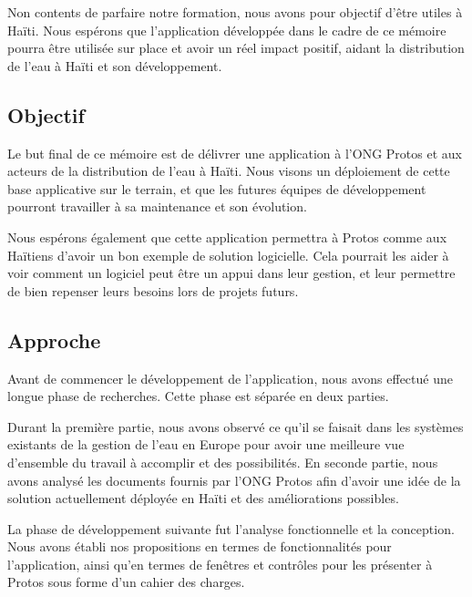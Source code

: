 \documentclass{EPL-master-thesis-covers-FR}
\begin{document}
			Non contents de parfaire notre formation, nous avons pour objectif d'être utiles à Haïti. Nous espérons que l'application développée dans le cadre de ce mémoire pourra être utilisée sur place et avoir un réel impact positif, aidant la distribution de l'eau à Haïti et son développement.

		\subsection*{Objectif}

			Le but final de ce mémoire est de délivrer une application à l'ONG Protos et aux acteurs de la distribution de l'eau à Haïti. Nous visons un déploiement de cette base applicative sur le terrain, et que les futures équipes de développement pourront travailler à sa maintenance et son évolution.

			Nous espérons également que cette application permettra à Protos comme aux Haïtiens d'avoir un bon exemple de solution logicielle. Cela pourrait les aider à voir comment un logiciel peut être un appui dans leur gestion, et leur permettre de bien repenser leurs besoins lors de projets futurs.

		\subsection*{Approche}

			Avant de commencer le développement de l'application, nous avons effectué une longue phase de recherches. Cette phase est séparée en deux parties.

			Durant la première partie, nous avons observé ce qu'il se faisait dans les systèmes existants de la gestion de l'eau en Europe pour avoir une meilleure vue d'ensemble du travail à accomplir et des possibilités. En seconde partie, nous avons analysé les documents fournis par l'ONG Protos afin d'avoir une idée de la solution actuellement déployée en Haïti et des améliorations possibles.

			La phase de développement suivante fut l'analyse fonctionnelle et la conception. Nous avons établi nos propositions en termes de fonctionnalités pour l'application, ainsi qu'en termes de fenêtres et contrôles pour les présenter à Protos sous forme d'un cahier des charges.
\end{document}
